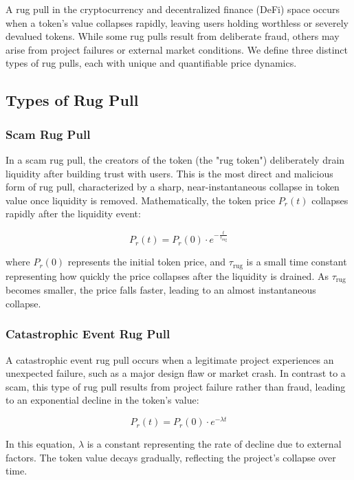 \documentclass{article}
\begin{document}
A rug pull in the cryptocurrency and decentralized finance (DeFi) space occurs when a token’s value collapses rapidly, leaving users holding worthless or severely devalued tokens. While some rug pulls result from deliberate fraud, others may arise from project failures or external market conditions. We define three distinct types of rug pulls, each with unique and quantifiable price dynamics.

\subsection{Types of Rug Pull}

\subsubsection{Scam Rug Pull}

In a scam rug pull, the creators of the token (the "rug token") deliberately drain liquidity after building trust with users. This is the most direct and malicious form of rug pull, characterized by a sharp, near-instantaneous collapse in token value once liquidity is removed. Mathematically, the token price \( P_{r}(t) \) collapses rapidly after the liquidity event:

\[
P_{r}(t) = P_{r}(0) \cdot e^{-\frac{t}{\tau_{\text{rug}}}}
\]

where \( P_{r}(0) \) represents the initial token price, and \( \tau_{\text{rug}} \) is a small time constant representing how quickly the price collapses after the liquidity is drained. As \( \tau_{\text{rug}} \) becomes smaller, the price falls faster, leading to an almost instantaneous collapse.

\subsubsection{Catastrophic Event Rug Pull}

A catastrophic event rug pull occurs when a legitimate project experiences an unexpected failure, such as a major design flaw or market crash. In contrast to a scam, this type of rug pull results from project failure rather than fraud, leading to an exponential decline in the token’s value:

\[
P_{r}(t) = P_{r}(0) \cdot e^{-\lambda t}
\]

In this equation, \( \lambda \) is a constant representing the rate of decline due to external factors. The token value decays gradually, reflecting the project's collapse over time.
\end{document}
